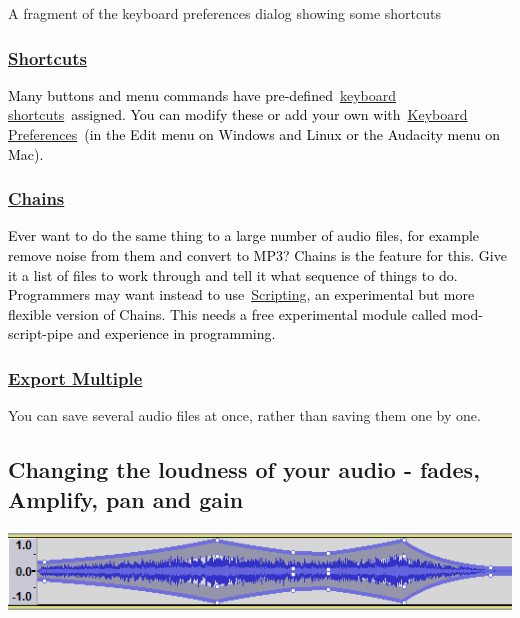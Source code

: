 \documentclass[letterpaper]{article}
\begin{document}
A fragment of the keyboard preferences dialog showing some shortcuts

\subsubsection[Shortcuts]{\href{https://manual.audacityteam.org/man/keyboard_shortcut_reference.html}{\textcolor[rgb]{0.3529412,0.21176471,0.5882353}{Shortcuts}}}
\textcolor{black}{Many buttons and menu commands have
pre-defined~}\href{https://manual.audacityteam.org/man/keyboard_shortcut_reference.html}{\textcolor[rgb]{0.3529412,0.21176471,0.5882353}{keyboard
shortcuts}}\textcolor{black}{~assigned. You can modify these or add your own
with~}\href{https://manual.audacityteam.org/man/keyboard_preferences.html}{\textcolor[rgb]{0.3529412,0.21176471,0.5882353}{Keyboard
Preferences}}\textcolor{black}{~(in the Edit menu on Windows and Linux or the {\textquotedbl}Audacity{\textquotedbl}
menu on Mac).}

\subsubsection[Chains]{\href{https://manual.audacityteam.org/man/chains_for_batch_processing_and_effects_automation.html}{\textcolor[rgb]{0.3529412,0.21176471,0.5882353}{Chains}}}
\textcolor{black}{Ever want to do the same thing to a large number of audio files, for example remove noise from them
and convert to MP3? Chains is the feature for this. Give it a list of files to work through and tell it what sequence
of things to do. Programmers may want instead to
use~}\href{https://manual.audacityteam.org/man/scripting.html}{\textcolor[rgb]{0.3529412,0.21176471,0.5882353}{Scripting}}\textcolor{black}{,
an experimental but more flexible version of Chains. This needs a free experimental module called mod-script-pipe and
experience in programming.}

\subsubsection[Export
Multiple]{\href{https://manual.audacityteam.org/man/export_multiple.html}{\textcolor[rgb]{0.3529412,0.21176471,0.5882353}{Export
Multiple}}}
{\color{black}
You can save several audio files at once, rather than saving them one by one.}

\subsection[Changing the loudness of your audio {}- fades, Amplify, pan and gain]{\color{black} Changing the loudness of
your audio - fades, Amplify, pan and gain}
 \includegraphics[width=14.049cm,height=2.143cm]{TourGuide-img013.png} 
\end{document}
